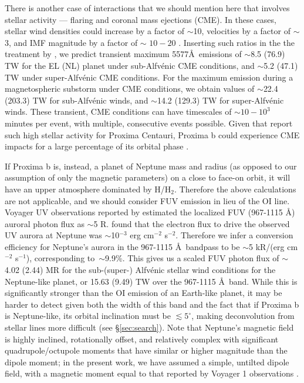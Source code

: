 \documentclass{emulateapj}
\begin{document}
There is another case of interactions that we should mention here that involves stellar activity --- flaring and coronal mass ejections (CME). In these cases, stellar wind densities could increase by a factor of $\sim$10, velocities by a factor of $\sim$3, and IMF magnitude by a factor of $\sim$ $10-20$ \citep{Khodachenko2007,Gopalswamy2009}. Inserting such ratios in the the treatment by \citet{Wang2014}, we predict transient maximum 5577\AA\ emissions of $\sim$8.5 (76.9) TW for the EL (NL) planet under sub-Alfv\'{e}nic CME conditions, and $\sim$5.2 (47.1) TW under super-Alfv\'{e}nic CME conditions. For the maximum emission during a magnetospheric substorm under CME conditions, we obtain values of $\sim$22.4 (203.3) TW for sub-Alfv\'{e}nic winds, and $\sim$14.2 (129.3) TW for super-Alfv\'{e}nic winds. These transient, CME conditions can have timescales of ${\sim} 10-10^3$ minutes per event, with multiple, consecutive events possible. Given that \citet{Davenport2016} report such high stellar activity for Proxima Centauri, Proxima b could experience CME impacts for a large percentage of its orbital phase \citep[e.g.,][]{Khodachenko2007}. 

If Proxima b is, instead, a planet of Neptune mass and radius (as opposed to our assumption of only the magnetic parameters) on a close to face-on orbit, it will have an upper atmosphere dominated by H/H$_2$. Therefore the above calculations are not applicable, and we should consider FUV emission in lieu of the OI line. Voyager UV observations reported by \citet{Sandel1990} estimated the localized FUV (967-1115 \AA) auroral photon flux as $\sim$5 R. \citet{Mauk1994} found that the electron flux to drive the observed UV aurora at Neptune was $\sim$10$^{-3}$ erg cm$^{-2}$ s$^{-2}$. Therefore we infer a conversion efficiency for Neptune's aurora in the 967-1115 \AA\ bandpass to be $\sim$5 kR/(erg cm$^{-2}$ s$^{-1}$), corresponding to~$\sim$9.9\%. This gives us a scaled FUV photon flux of $\sim$4.02 (2.44) MR for the sub-\mbox{(super-)} Alfv\'{e}nic stellar wind conditions for the Neptune-like planet, or 15.63 (9.49) TW over the 967-1115 \AA\ band. While this is significantly stronger than the OI emission of an Earth-like planet, it may be harder to detect given both the width of this band and the fact that if Proxima b is Neptune-like, its orbital inclination must be $\lesssim 5^\circ$, making deconvolution from stellar lines more difficult (see \S\ref{sec:search}). Note that Neptune's magnetic field is highly inclined, rotationally offset, and relatively complex with significant quadrupole/octupole moments that have similar or higher magnitude than the dipole moment; in the present work, we have assumed a simple, untilted dipole field, with a magnetic moment equal to that reported by Voyager 1 observations \citep[e.g.][]{Connerney1991,Mauk2012}. 
\end{document}
